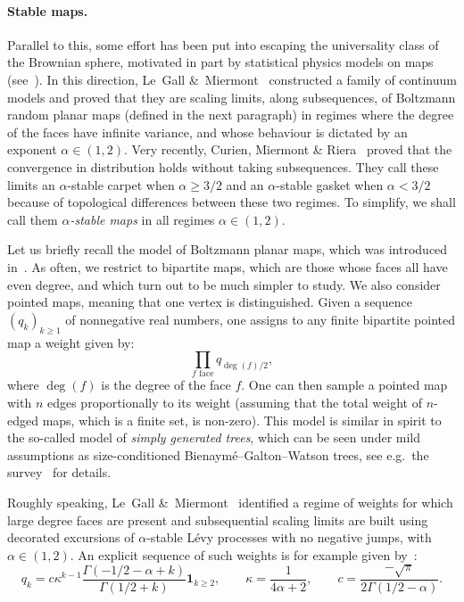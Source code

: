 \documentclass[british, a4paper,11pt]{article}
\numberwithin{equation}{section}
\theoremstyle{definition}
\begin{document}
\paragraph*{Stable maps.}
Parallel to this, some effort has been put into escaping the universality class of the Brownian sphere, motivated in part by statistical physics models on maps (see~\cite[Section~8]{LGM11}).
In this direction, Le~Gall \&~Miermont~\cite{LGM11} constructed a family of continuum models and proved that they are scaling limits, along subsequences, of Boltzmann random planar maps (defined in the next paragraph) in regimes where the degree of the faces have infinite variance, and whose behaviour is dictated by an exponent $\alpha \in (1,2)$. 
Very recently, Curien, Miermont \& Riera~\cite{CMR25} proved that the convergence in distribution holds without taking subsequences. They call these limits an $\alpha$-stable carpet when $\alpha \ge 3/2$ and an $\alpha$-stable gasket when $\alpha < 3/2$ because of topological differences between these two regimes. To simplify, we shall  call them \emph{$\alpha$-stable maps} in all regimes $\alpha \in (1,2)$.


Let us briefly recall the model of Boltzmann planar maps, which was introduced in~\cite{MM07}. As often, we restrict to bipartite maps, which are those whose faces all have even degree, and which turn out to be much simpler to study. We also consider pointed maps, meaning that one vertex is distinguished.
Given a sequence $(q_k)_{k \geq 1}$ of  nonnegative real numbers, one assigns to any finite bipartite pointed map a weight given by: 
\[\prod_{f \text{ face}} q_{\deg(f)/2},\]
where $\deg(f)$ is the degree of the face $f$.
One can then sample a pointed map with $n$ edges proportionally to its weight (assuming that the total weight of $n$-edged maps, which is a finite set, is non-zero).  This model is similar in spirit to the so-called model of \emph{simply generated trees}, which can be seen under mild assumptions as size-conditioned Bienaym\'e--Galton--Watson trees, see e.g.~the survey~\cite{Jan12} for details.

Roughly speaking, Le~Gall \&~Miermont~\cite{LGM11} identified a regime of weights for which  large degree faces are present and subsequential scaling limits  are built using decorated excursions of $\alpha$-stable L\'evy processes with no negative jumps, with $\alpha \in (1,2)$. An explicit sequence of such weights is for example given by~\cite[Section 6]{BC17}:
\begin{equation}
\label{eq:explicit}
q_{k}= c \kappa^{k-1} \frac{\Gamma(-1/2-\alpha+k)}{\Gamma(1/2+k)} \mathbf{1}_{k \geq 2}, 
\qquad \kappa= \frac{1}{4 \alpha+2}, 
\qquad c= \frac{-\sqrt{\pi}}{2\Gamma(1/2-\alpha)}.
\end{equation}
\end{document}
